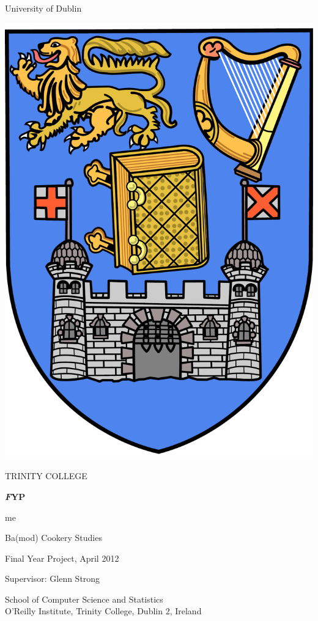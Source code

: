
    
\thispagestyle{empty}
\begin{center}
{\sffamily
{\huge University of Dublin}
 
\vspace{10pt}
 
\includegraphics[scale=0.1]{trinitycollege.pdf}
 
\vspace{10pt}
 
{\Huge TRINITY COLLEGE}
 
\vspace{60pt}
 
\textbf{ \Large \emph FYP}
 
\vspace{20pt}
 
me
 
\vspace{20pt}
 
Ba(mod) Cookery Studies
 
Final Year Project, April 2012
 
Supervisor: Glenn Strong
 
\vspace{100pt}
 
School of Computer Science and Statistics \\
O'Reilly Institute, Trinity College, Dublin 2, Ireland
}
\end{center}

